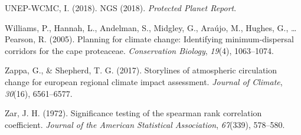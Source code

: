 \documentclass[]{article}
\begin{document}
\leavevmode\hypertarget{ref-unep2018ngs}{}%
UNEP-WCMC, I. (2018). NGS (2018). \emph{Protected Planet Report}.

\leavevmode\hypertarget{ref-williams2005planning}{}%
Williams, P., Hannah, L., Andelman, S., Midgley, G., Araújo, M., Hughes, G., \ldots{} Pearson, R. (2005). Planning for climate change: Identifying minimum-dispersal corridors for the cape proteaceae. \emph{Conservation Biology}, \emph{19}(4), 1063--1074.

\leavevmode\hypertarget{ref-zappa2017storylines}{}%
Zappa, G., \& Shepherd, T. G. (2017). Storylines of atmospheric circulation change for european regional climate impact assessment. \emph{Journal of Climate}, \emph{30}(16), 6561--6577.

\leavevmode\hypertarget{ref-zar1972significance}{}%
Zar, J. H. (1972). Significance testing of the spearman rank correlation coefficient. \emph{Journal of the American Statistical Association}, \emph{67}(339), 578--580.
\end{document}
